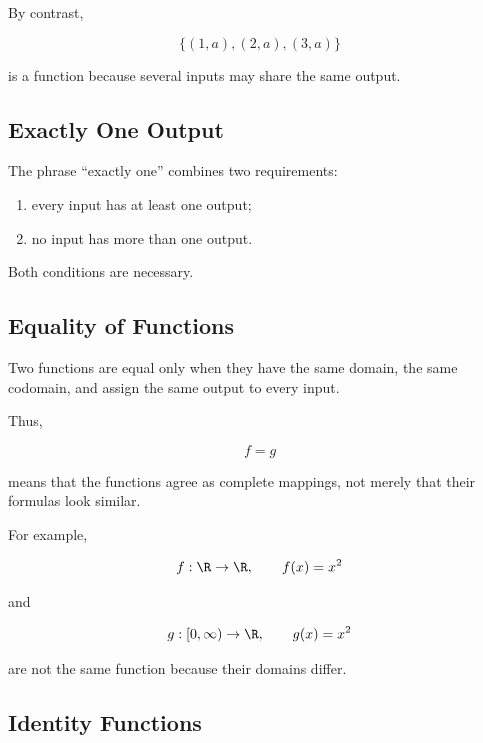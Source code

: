 By contrast,

\[ \{(1,a),(2,a),(3,a)\} \]

is a function because several inputs may share the same output.

\subsection{Exactly One Output}
\label{subsec:exactly-one-output}

The phrase ``exactly one'' combines two requirements:

\begin{enumerate}
    \item every input has at least one output;
    \item no input has more than one output.
\end{enumerate}

Both conditions are necessary.

\subsection{Equality of Functions}
\label{subsec:function-equality}

Two functions are equal only when they have the same domain, the same
codomain, and assign the same output to every input.

Thus,

\[ f=g \]

means that the functions agree as complete mappings, not merely that their
formulas look similar.

For example,

\[ f:\R\to\R,\qquad f(x)=x^2 \]

and

\[ g:[0,\infty)\to\R,\qquad g(x)=x^2 \]

are not the same function because their domains differ.

\subsection{Identity Functions}
\label{subsec:identity-functions}

